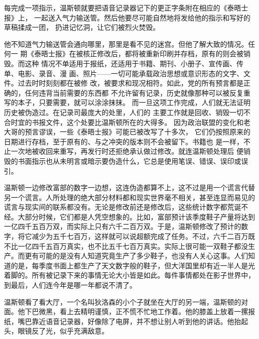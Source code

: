 每完成一项指示，温斯顿就要把语音记录器记下的更正字条附在相应的《泰晤士报》上，
一起送入气力输送管。然后他要尽可能自然地将发给他的指示和写好的草稿揉成一团，
扔进记忆洞，让它们被烈火焚毁。

他不知道气力输送管会通向哪里，那里是看不见的迷宫。但他了解大致的情况。任何一
期《泰晤士报》在被核正修改后，都将被重新印刷并存档，原有的则会被销毁。而这种
情况不单适用于报纸，还适用于书籍、期刊、小册子、宣传画、传单、电影、录音、漫
画、照片——一切可能承载政治思想或意识形态的文字、文件。过去时时刻刻都在被修
改，被要求和现况相符。如此，党的所有预言都是正确的，任何违背当前需要的东西都
不允许留有记录，历史就像那种可以被反复重写的本子，只要需要，就可以涂涂抹抹。
而一旦这项工作完成，人们就无法证明历史被伪造过。在记录司最庞大的处里，人们的
主要工作就是回收、销毁一切不合时宜的书报文件，这个处要比温斯顿所在的大得多。
因为政治联盟的变化和老大哥的预言谬误，一些《泰晤士报》可能已被改写了十多次，
它们仍按照原来的日期进行存档，至于原有的、与之冲突的版本则不会被留下。书籍也
是一样，不止一次地被收回来重写，再发行时还拒绝承认做过修改。就连温斯顿处理后
便销毁的书面指示也从未明言或暗示要伪造什么，它总是使用笔误、错误、误印或误
引。

温斯顿一边修改富部的数字一边想，这连伪造都算不上，这不过是用一个谎言代替另一个谎言。人所处理的绝大部分材料都和现实世界毫不相关，甚至连显而易见的谎言与现实间的联系都没有。无论是修改前还是修改后，这些统计数字都荒诞不经。大部分时候，它们都是人凭空想象的。比如，富部预计该季度鞋子产量将达到一亿四千五百万双，而实际上只有六千二百万双。于是，温斯顿修改了预计的数字，将它减少为五千七百万，这样就可以说超额完成了任务。不过，六千二百万既不比一亿四千五百万真实，也不比五千七百万真实。实际上很可能一双鞋子都没生产。而更有可能的是没有人知道究竟生产了多少鞋子，也没有人关心这事。人们知道的是，每季度书面上都生产了天文数字般的鞋子，但大洋国里却有近一半人是光着脚的。所有被记录下来的事情无论大小皆是如此。每件事情都处在影子世界中，到最后，人们连今年是哪一年都说不清了。

温斯顿看了看大厅，一个名叫狄洛森的小个子就坐在大厅的另一端，温斯顿的对面。他下巴微黑，看上去精明谨慎，正不慌不忙地工作着。他的膝盖上放着一摞报纸，嘴巴靠近语音记录器，好像除了电屏，并不想让别人听到他的讲话。他抬起头，眼镜反了光，似乎充满敌意。

